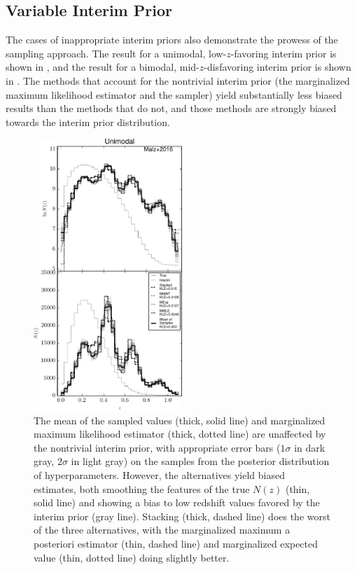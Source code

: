 \subsection{Variable Interim Prior}

The cases of inappropriate interim priors also demonstrate the prowess of the sampling approach.  
The result for a unimodal, low-$z$-favoring interim prior is shown in , and the result for a bimodal, mid-$z$-disfavoring interim prior is shown in .  
The methods that account for the nontrivial interim prior (the marginalized maximum likelihood estimator and the sampler) yield substantially less biased results than the methods that do not, and those methods are strongly biased towards the interim prior distribution.  

\begin{figure}
	\includegraphics[width=0.5\textwidth]{figures/chippr/uint_comps.pdf}
	\caption{The mean of the sampled values (thick, solid line) and marginalized maximum likelihood estimator (thick, dotted line) are unaffected by the nontrivial interim prior, with appropriate error bars ($1\sigma$ in dark gray, $2\sigma$ in light gray) on the samples from the posterior distribution of hyperparameters.  
		However, the alternatives yield biased estimates, both smoothing the features of the true $N(z)$ (thin, solid line) and showing a bias to low redshift values favored by the interim prior (gray line).  
		Stacking (thick, dashed line) does the worst of the three alternatives, with the marginalized maximum a posteriori estimator (thin, dashed line) and marginalized expected value (thin, dotted line) doing slightly better.}
\end{figure}

